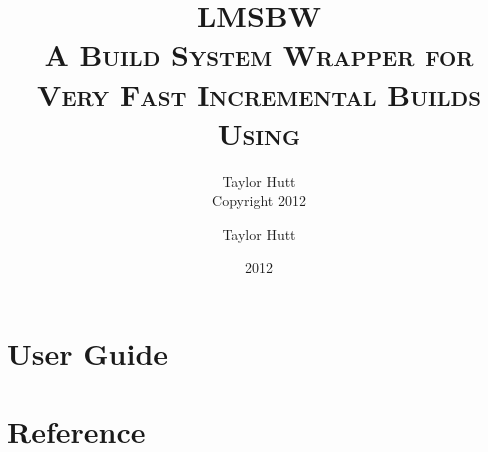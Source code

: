 \documentclass[10pt]{report}
\title{LMSBW \\ \small{\textsc{A Build System Wrapper for \\ Very
    Fast Incremental Builds \\ Using \gnumake}}}
\author{Taylor Hutt \\ Copyright 2012}
\author{Taylor Hutt}
\date {2012}
\begin{document}

\pagestyle{empty}
\pagestyle{headings}
\maketitle
\tableofcontents
\listoffigures
\part{User Guide}




\part{Reference}









\appendix


\printindex
\end{document}
